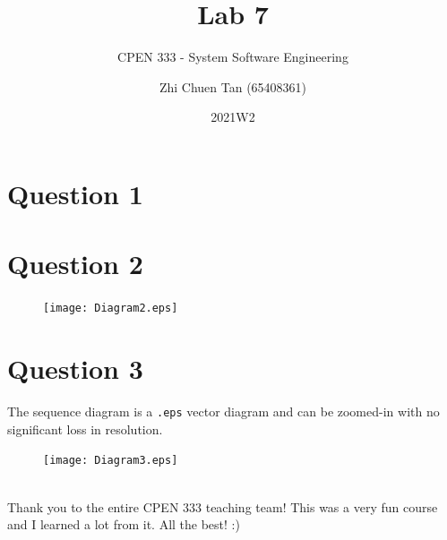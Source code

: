 \documentclass[letterpaper, titlepage, DIV=13, 12pt]{scrartcl}
\title{Lab 7}
\subtitle{CPEN 333 - System Software Engineering}
\author{
    Zhi Chuen Tan (65408361)
}
\date{2021W2}
\begin{document}
\onehalfspacing
\hypersetup{pageanchor=false}
\begin{titlepage}
    \maketitle
\end{titlepage}
\hypersetup{pageanchor=true}

\section*{Question 1}
\begin{figure}[htbp]
    \centering
    
\end{figure}

\newpage
\section*{Question 2}
\begin{figure}[htbp]
    \centering
    \texttt{[image: Diagram2.eps]}
\end{figure}

\newpage
\section*{Question 3}
The sequence diagram is a \texttt{.eps} vector diagram and can be zoomed-in with no significant loss in resolution.
\begin{figure}[htbp]
    \centering
    \texttt{[image: Diagram3.eps]}
\end{figure} \\

Thank you to the entire CPEN 333 teaching team! This was a very fun course and I learned a lot from it. All the best! :)
\end{document}
